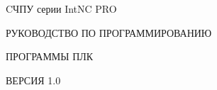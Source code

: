 \begingroup

\thispagestyle{empty}

\pagecolor{title_color}
 
\begin{figure}[h!]{
        \noindent {}
}

\end{figure}

    \centering
    \vspace*{3cm}

    {\LARGE CЧПУ серии IntNC PRO}\par 

    \vspace*{0.5cm}
    
    \vspace*{1cm}

    {\LARGE РУКОВОДСТВО ПО ПРОГРАММИРОВАНИЮ}\par 
    
    \vspace*{1cm}
        
    {\LARGE ПРОГРАММЫ ПЛК}\par 

\vspace*{1cm}
    
     {\large ВЕРСИЯ 1.0}\par 


\begin{figure}[b]{
        \noindent {}
}
\end{figure}


\endgroup

\newpage

\pagecolor{white}